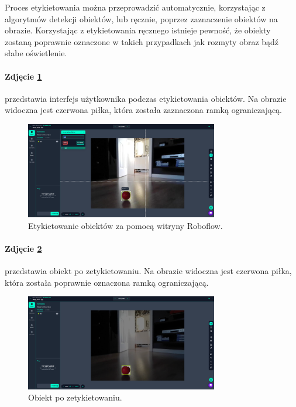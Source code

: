 \documentclass[a4paper,twoside,12pt]{book}
\begin{document}
Proces etykietowania można przeprowadzić automatycznie, korzystając z algorytmów detekcji obiektów, lub ręcznie, poprzez zaznaczenie obiektów na obrazie. Korzystając z etykietowania ręcznego istnieje pewność, że obiekty zostaną poprawnie oznaczone w takich przypadkach jak rozmyty obraz bądź słabe oświetlenie. 


\paragraph{Zdjęcie \ref{fig:labeling1}}
przedstawia interfejs użytkownika podczas etykietowania obiektów. Na obrazie widoczna jest czerwona piłka, która została zaznaczona ramką ograniczającą.

\begin{figure}[h]
	\centering
	\includegraphics[width=0.75\textwidth]{Images/Roboflow/labeling1.png}
	\caption{Etykietowanie obiektów za pomocą witryny Roboflow.}
	\label{fig:labeling1}
\end{figure}

\newpage
\paragraph{Zdjęcie \ref{fig:labeling2}}
przedstawia obiekt po zetykietowaniu. Na obrazie widoczna jest czerwona piłka, która została poprawnie oznaczona ramką ograniczającą.

\begin{figure}[h]
    \centering
    \includegraphics[width=0.75\textwidth]{Images/Roboflow/labeling2.png}
    \caption{Obiekt po zetykietowaniu.}
    \label{fig:labeling2}
\end{figure}
\end{document}

